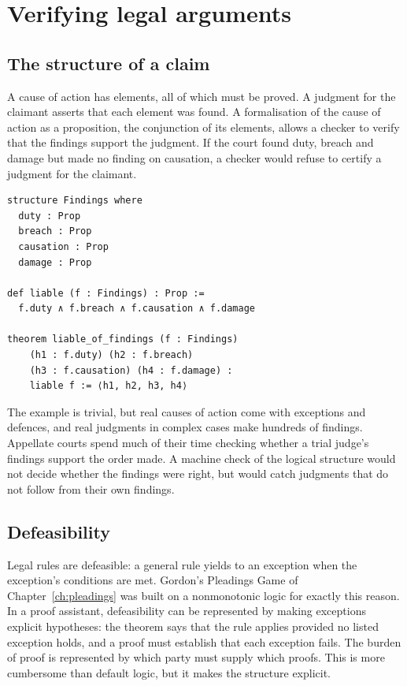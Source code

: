 \section{Verifying legal arguments}

\subsection{The structure of a claim}

A cause of action has elements, all of which must be proved. A judgment for the claimant asserts that each element was found. A formalisation of the cause of action as a proposition, the conjunction of its elements, allows a checker to verify that the findings support the judgment. If the court found duty, breach and damage but made no finding on causation, a checker would refuse to certify a judgment for the claimant.

\begin{lstlisting}[language=Lean, caption={Elements of negligence as a structure; a judgment requires every element.}]
structure Findings where
  duty : Prop
  breach : Prop
  causation : Prop
  damage : Prop

def liable (f : Findings) : Prop :=
  f.duty ∧ f.breach ∧ f.causation ∧ f.damage

theorem liable_of_findings (f : Findings)
    (h1 : f.duty) (h2 : f.breach)
    (h3 : f.causation) (h4 : f.damage) :
    liable f := ⟨h1, h2, h3, h4⟩
\end{lstlisting}

The example is trivial, but real causes of action come with exceptions and defences, and real judgments in complex cases make hundreds of findings. Appellate courts spend much of their time checking whether a trial judge's findings support the order made. A machine check of the logical structure would not decide whether the findings were right, but would catch judgments that do not follow from their own findings.

\subsection{Defeasibility}

Legal rules are defeasible: a general rule yields to an exception when the exception's conditions are met. Gordon's Pleadings Game of Chapter~\ref{ch:pleadings} was built on a nonmonotonic logic for exactly this reason. In a proof assistant, defeasibility can be represented by making exceptions explicit hypotheses: the theorem says that the rule applies provided no listed exception holds, and a proof must establish that each exception fails. The burden of proof is represented by which party must supply which proofs. This is more cumbersome than default logic, but it makes the structure explicit.

